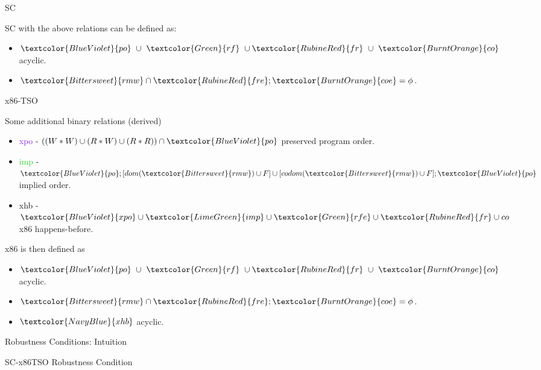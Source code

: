 \documentclass[notes, xcolor=dvipsnames]{beamer}
\newcommand{\po}{\textcolor{BlueViolet}{po}}
\newcommand{\xpo}{\textcolor{BlueViolet}{xpo}}
\newcommand{\rf}{\textcolor{Green}{rf}}
\newcommand{\co}{\textcolor{BurntOrange}{co}}
\newcommand{\coe}{\textcolor{BurntOrange}{coe}}
\newcommand{\fr}{\textcolor{RubineRed}{fr}}
\newcommand{\fre}{\textcolor{RubineRed}{fre}}
\newcommand{\xhb}{\textcolor{NavyBlue}{xhb}}
\newcommand{\rfe}{\textcolor{Green}{rfe}}
\newcommand{\rmw}{\textcolor{Bittersweet}{rmw}}
\newcommand{\imp}{\textcolor{LimeGreen}{imp}}
\begin{document}
    \begin{frame}{SC}

        SC with the above relations can be defined as:
        \begin{itemize}
            \item $\po \ \cup \ \rf \ \cup \fr \ \cup \ \co$ acyclic.
            \item $\rmw \cap \fre;\coe = \phi$.
        \end{itemize}


    \end{frame}

    \begin{frame}{x86-TSO}

        Some additional binary relations (derived)
        \begin{itemize}
            \item {\xpo} - $((W * W) \cup (R * W) \cup (R * R)) \cap \po$ preserved program order.
            \item {\imp} - $\po;[dom(\rmw) \cup F] \cup [codom(\rmw) \cup F];\po$ implied order.
            \item {\xhb} - $\xpo \cup \imp \cup \rfe \cup \fr \cup co$ x86 happens-before.
        \end{itemize}

        x86 is then defined as 
        \begin{itemize}
            \item $\po \ \cup \ \rf \ \cup \fr \ \cup \ \co$ acyclic.
            \item $\rmw \cap \fre;\coe = \phi$.
            \item $\xhb$ acyclic.
        \end{itemize}

    \end{frame}
    

    \begin{frame}{Robustness Conditions: Intuition}


    \end{frame}

    \begin{frame}{SC-x86TSO Robustness Condition}


    \end{frame}
\end{document}
